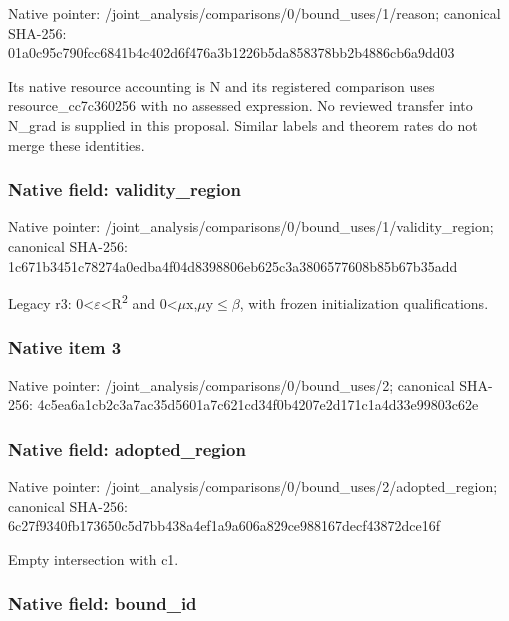 \documentclass[10pt,a4paper]{article}
\begin{document}
Native pointer: /joint\_analysis/comparis\allowbreak{}ons/0/bound\_uses/1/reaso\allowbreak{}n; canonical SHA-256: 01a0c95c790fcc6841b4c402\allowbreak{}d6f476a3b1226b5da858378b\allowbreak{}b2b4886cb6a9dd03


Its native resource accounting is N and its registered comparison uses resource\_cc7c360256 with no assessed expression. No reviewed transfer into N\_grad is supplied in this proposal. Similar labels and theorem rates do not merge these identities.


\subsubsection{Native field: validity\_region}


Native pointer: /joint\_analysis/comparis\allowbreak{}ons/0/bound\_uses/1/valid\allowbreak{}ity\_region; canonical SHA-256: 1c671b3451c78274a0edba4f\allowbreak{}04d8398806eb625c3a380657\allowbreak{}7608b85b67b35add


Legacy r3: 0<\ensuremath{\varepsilon}<R\textsuperscript{2} and 0<\ensuremath{\mu}x,\ensuremath{\mu}y\ensuremath{\le}\ensuremath{\beta}, with frozen initialization qualifications.


\subsubsection{Native item 3}


Native pointer: /joint\_analysis/comparis\allowbreak{}ons/0/bound\_uses/2; canonical SHA-256: 4c5ea6a1cb2c3a7ac35d5601\allowbreak{}a7c621cd34f0b4207e2d171c\allowbreak{}1a4d33e99803c62e



\subsubsection{Native field: adopted\_region}


Native pointer: /joint\_analysis/comparis\allowbreak{}ons/0/bound\_uses/2/adopt\allowbreak{}ed\_region; canonical SHA-256: 6c27f9340fb173650c5d7bb4\allowbreak{}38a4ef1a9a606a829ce98816\allowbreak{}7decf43872dce16f


Empty intersection with c1.


\subsubsection{Native field: bound\_id}
\end{document}
